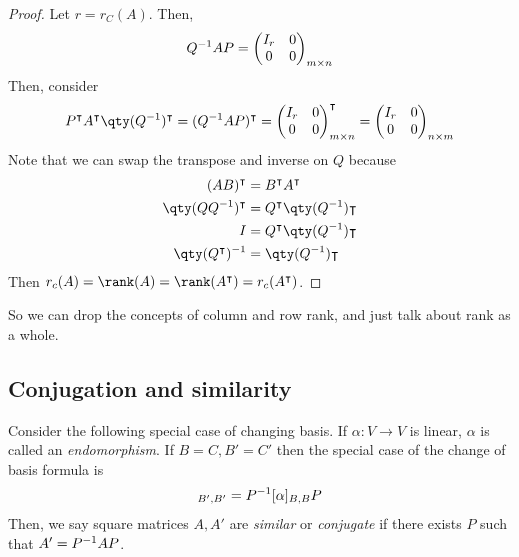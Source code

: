     \begin{proof}
        Let $r = r_C(A)$.
        Then,
        \begin{align*}
            Q^{-1} AP = \begin{pmatrix}
                I_r & 0 \\
                0   & 0
            \end{pmatrix}_{m \times n}
        \end{align*}
        Then, consider
        \begin{align*}
            P^\transpose A^\transpose \qty(Q\inv)^\transpose = (Q\inv AP)^\transpose = \begin{pmatrix}
                I_r & 0 \\
                0   & 0
            \end{pmatrix}_{m \times n}^\transpose = \begin{pmatrix}
                I_r & 0 \\
                0   & 0
            \end{pmatrix}_{n \times m}
        \end{align*}
        Note that we can swap the transpose and inverse on $Q$ because
        \begin{align*}
            (AB)^\transpose          & = B^\transpose A^\transpose           \\
            \qty(QQ\inv)^\transpose & = Q^\transpose \qty(Q\inv)\transpose \\
            I                        & = Q^\transpose \qty(Q\inv)\transpose \\
            \qty(Q^\transpose)\inv  & = \qty(Q\inv)\transpose
        \end{align*}
        Then $r_c(A) = \rank(A) = \rank(A^\transpose) = r_c(A^\transpose)$.
    \end{proof}
    \noindent So we can drop the concepts of column and row rank, and just talk about rank as a whole.

    \subsection{Conjugation and similarity}
    Consider the following special case of changing basis.
    If $\alpha \colon V \to V$ is linear, $\alpha$ is called an \textit{endomorphism}.
    If $B = C, B' = C'$ then the special case of the change of basis formula is
    \begin{align*}
        [\alpha]_{B',B'} = P\inv [\alpha]_{B,B} P
    \end{align*}
    Then, we say square matrices $A, A'$ are \textit{similar} or \textit{conjugate} if there exists $P$ such that $A' = P^{-1} A P$.

